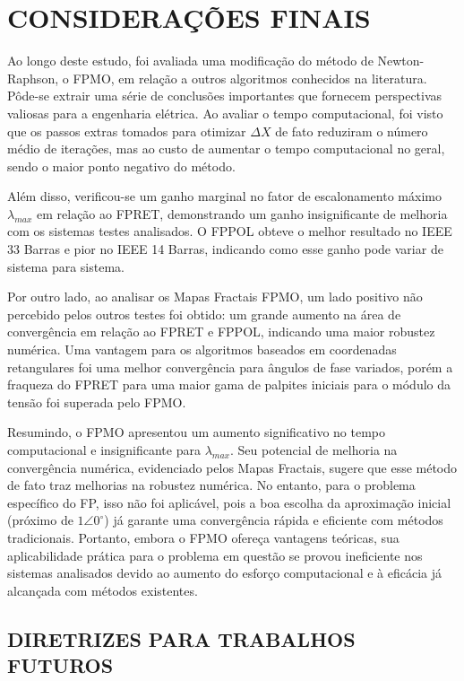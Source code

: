 \chapter{CONSIDERAÇÕES FINAIS}\label{cap:conclusao}
Ao longo deste estudo, foi avaliada uma modificação do método de Newton-Raphson, o \ac{FPMO}, em relação a outros algoritmos conhecidos na literatura. Pôde-se extrair uma série de conclusões importantes que fornecem perspectivas valiosas para a engenharia elétrica. Ao avaliar o tempo computacional, foi visto que os passos extras tomados para otimizar $\Delta X$ de fato reduziram o número médio de iterações, mas ao custo de aumentar o tempo computacional no geral, sendo o maior ponto negativo do método.

Além disso, verificou-se um ganho marginal no fator de escalonamento máximo $\lambda_{max}$ em relação ao \ac{FPRET}, demonstrando um ganho insignificante de melhoria com os sistemas testes analisados. O \acs{FPPOL} obteve o melhor resultado no IEEE 33 Barras e pior no IEEE 14 Barras, indicando como esse ganho pode variar de sistema para sistema.

Por outro lado, ao analisar os Mapas Fractais \ac{FPMO}, um lado positivo não percebido pelos outros testes foi obtido: um grande aumento na área de convergência em relação ao \ac{FPRET} e \acs{FPPOL}, indicando uma maior robustez numérica. 
Uma vantagem para os algoritmos baseados em coordenadas retangulares foi uma melhor convergência para ângulos de fase variados, porém a fraqueza do \ac{FPRET} para uma maior gama de palpites iniciais para o módulo da tensão foi superada pelo \ac{FPMO}. 

Resumindo, o FPMO apresentou um aumento significativo no tempo computacional e insignificante para $\lambda _{max}$. Seu potencial de melhoria na convergência numérica, evidenciado pelos Mapas Fractais, sugere que esse método de fato traz melhorias na robustez numérica. No entanto, para o problema específico do \ac{FP}, isso não foi aplicável, pois a boa escolha da aproximação inicial (próximo de $1\angle 0^\circ$) já garante uma convergência rápida e eficiente com métodos tradicionais. Portanto, embora o \ac{FPMO} ofereça vantagens teóricas, sua aplicabilidade prática para o problema em questão se provou ineficiente nos sistemas analisados devido ao aumento do esforço computacional e à eficácia já alcançada com métodos existentes. 


\section{DIRETRIZES PARA TRABALHOS FUTUROS}

